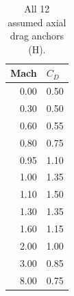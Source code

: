 \begin{table}[htbp]
\centering\small
\caption{All 12 assumed axial drag anchors (H).}
\label{tab:cd}
\begin{tabularx}{\linewidth}{@{}rX@{}}
\toprule
Mach & $C_D$ \\
\midrule
0.00 & 0.50 \\
0.30 & 0.50 \\
0.60 & 0.55 \\
0.80 & 0.75 \\
0.95 & 1.10 \\
1.00 & 1.35 \\
1.10 & 1.50 \\
1.30 & 1.35 \\
1.60 & 1.15 \\
2.00 & 1.00 \\
3.00 & 0.85 \\
8.00 & 0.75 \\
\bottomrule
\end{tabularx}
\par{}
\end{table}

